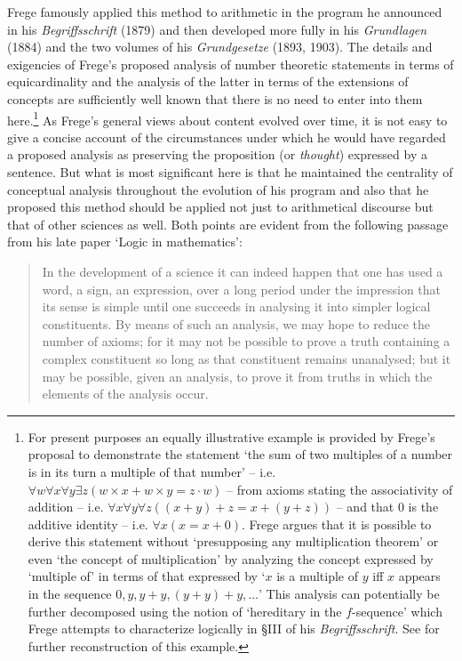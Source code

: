 \documentclass[11pt,fleqn,leqno]{article}
\def\A{\forall}
\def\E{\exists}
\begin{document}
Frege famously applied this method to arithmetic in the program he announced in his  \textsl{Begriffsschrift} (1879) and then developed more fully in his \textsl{Grundlagen} (1884) and the two volumes of his \textsl{Grundgesetze} (1893, 1903).  The details and exigencies of Frege's proposed analysis of number theoretic statements in terms of equicardinality and the analysis of the latter in terms of the extensions of concepts are sufficiently well known that there is no need to enter into them here.\footnote{For present purposes an equally illustrative example is provided by Frege's \citeyearpar[pp. 27-32]{Frege1880} proposal to demonstrate the statement `the sum of two multiples of a number is in its turn a multiple of that number' -- i.e. $\A w \A x \A y \E z(w \times x + w \times y = z \cdot w)$ -- from axioms stating the associativity of addition -- i.e. $\A x \A y \A z((x+ y) + z = x + (y +z))$ -- and that $0$ is the additive identity -- i.e. $\A x(x = x + 0)$.   Frege argues that it is possible to derive this statement without `presupposing any multiplication theorem' or even `the concept of multiplication' by analyzing the concept expressed by `multiple of' in terms of that expressed by `$x$ is a multiple of $y$ iff $x$ appears in the sequence $0, y, y+y, (y + y) + y, \ldots$'  This analysis can potentially be further decomposed using the notion of `hereditary in the $f$-sequence' which Frege attempts to characterize logically in \S III of his \textsl{Begriffsschrift}.  See \citep[\S 1]{Blanchette2012} for further reconstruction of this example.}  As Frege's general views about content evolved over time, it is not easy to give a concise account of the circumstances under which he would have regarded a proposed analysis as preserving the proposition (or \textsl{thought}) expressed by a sentence.   But what is most significant here is that he maintained the centrality of conceptual analysis throughout the evolution of his program and also that he proposed this method should be applied not just to arithmetical discourse but that of other sciences as well.  Both points are evident from the following passage from his late paper `Logic in mathematics':
\begin{quote}
{\footnotesize In the development of a science it can indeed happen that one has used a word, a sign, an expression, over a long period under the impression that its sense is simple until one succeeds in analysing it into simpler logical constituents. By means of such an analysis, we may hope to reduce the number of axioms; for it may not be possible to prove a truth containing a complex constituent so long as that constituent remains unanalysed; but it may be possible, given an analysis, to prove it from truths in which the elements of the analysis occur.  \hfill \citeyearpar[p. 209]{Frege1914a}}
\end{quote}  
\end{document}

